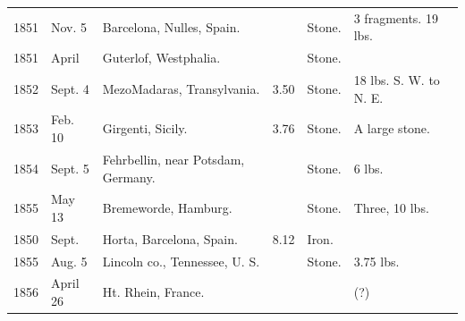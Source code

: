 \documentclass[a4paper, 12pt, oneside]{article}
\begin{document}
\begin{center}
\begin{longtable}{|p{10mm}|p{15mm}|p{32mm}|p{13mm}|p{13mm}|p{26mm}|}
        1851 & Nov. 5 & Barcelona, Nulles, Spain. & ~ & Stone. & 3 fragments. 19 lbs. \\
        1851 & April & Guterlof, Westphalia. & ~ & Stone. & ~ \\
        1852 & Sept. 4 & Mezo\-Madaras, Transylvania. & 3.50 & Stone. & 18 lbs. S. W. to N. E. \\
        1853 & Feb. 10 & Girgenti, Sicily. & 3.76 & Stone. & A large stone. \\
        1854 & Sept. 5 & Fehrbellin, near Potsdam, Germany. & ~ & Stone. & 6 lbs. \\
        1855 & May 13 & Bremeworde, Hamburg. & ~ & Stone. & Three, 10 lbs. \\
        1850 & Sept. & Horta, Barcelona, Spain. & 8.12 & Iron. & ~ \\
        1855 & Aug. 5 & Lincoln co., Tennessee, U. S. & ~ & Stone. & 3.75 lbs. \\
        1856 & April 26 & Ht. Rhein, France. & ~ & ~ & (?) \\ \hline
    \end{longtable}
\end{center}
\clearpage
\end{document}
